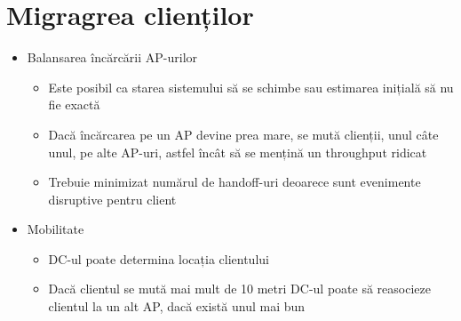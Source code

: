 \section{Migragrea clienților}

\begin{frame}
\begin{itemize}
  \item Balansarea încărcării AP-urilor
  \begin{itemize}
    \item Este posibil ca starea sistemului să se schimbe sau estimarea inițială să nu fie exactă
    \item Dacă încărcarea pe un AP devine prea mare, se mută clienții, unul câte unul, pe alte AP-uri, astfel încât să se mențină un throughput ridicat
    \item Trebuie minimizat numărul de handoff-uri deoarece sunt evenimente disruptive pentru client
  \end{itemize}
  \item Mobilitate
  \begin{itemize}
    \item DC-ul poate determina locația clientului
    \item Dacă clientul se mută mai mult de 10 metri DC-ul poate să reasocieze clientul la un alt AP, dacă există unul mai bun
  \end{itemize}
\end{itemize}
\end{frame}

